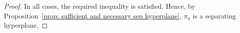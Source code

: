 \documentclass{article}
\begin{document}
\begin{proof}


	

	
	In all cases, the required inequality is satisfied. Hence, by Proposition~\ref{prop: sufficient and necessary sep hyperplane}, \(\pi_a\) is a separating hyperplane.
	\end{proof}
\end{document}
